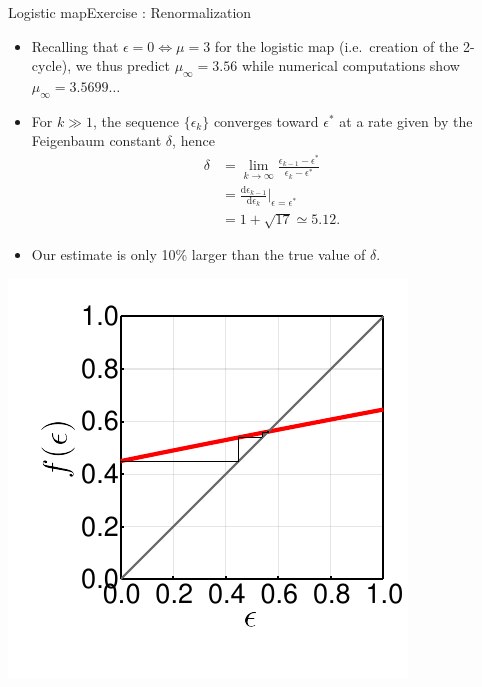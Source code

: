 \documentclass[usenames,dvipsnames,svgnames,10pt,aspectratio=169]{beamer}
\begin{document}
\begin{frame}[t, c]{Logistic map}{Exercise : Renormalization}
	\begin{minipage}{.68\textwidth}
		\begin{itemize}
			\item Recalling that \( \epsilon = 0 \iff \mu = 3 \) for the logistic map (i.e.\ creation of the 2-cycle), we thus predict \( \mu_{\infty} = 3.56 \) while numerical computations show \( \mu_{\infty} = 3.5699\ldots \)

			\medskip

			\item For \( k \gg 1 \), the sequence \( \{ \epsilon_k \} \) converges toward \( \epsilon^* \) at a rate given by the Feigenbaum constant \( \delta \), hence
			\[
				\begin{aligned}
					\delta & = \lim_{k \to \infty} \frac{\epsilon_{k-1} - \epsilon^*}{\epsilon_{k} - \epsilon^*} \\
					& = \frac{\mathrm{d} \epsilon_{k-1}}{\mathrm{d}\epsilon_k}\bigg\lvert_{\epsilon=\epsilon^*} \\
					& = 1 + \sqrt{17} \simeq 5.12.
				\end{aligned}
			\]

			\item Our estimate is only 10\% larger than the true value of \( \delta \).
		\end{itemize}
	\end{minipage}%
	\hfill
	\begin{minipage}{.28\textwidth}
		\includegraphics[width=\textwidth]{renormalization_epsilon_sequence}
	\end{minipage}

	\vspace{1cm}
\end{frame}
\end{document}
